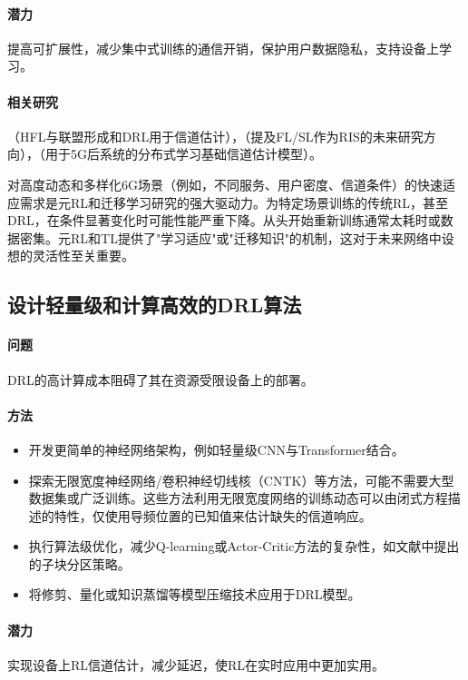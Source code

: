 \documentclass[journal]{IEEEtran}
\begin{document}
\paragraph{潜力} 
提高可扩展性，减少集中式训练的通信开销，保护用户数据隐私，支持设备上学习。

\paragraph{相关研究} 
\cite{ref55}（HFL与联盟形成和DRL用于信道估计），\cite{ref7}（提及FL/SL作为RIS的未来研究方向），\cite{ref4}（用于5G后系统的分布式学习基础信道估计模型）。

对高度动态和多样化6G场景（例如，不同服务、用户密度、信道条件）的快速适应需求是元RL和迁移学习研究的强大驱动力。为特定场景训练的传统RL，甚至DRL，在条件显著变化时可能性能严重下降。从头开始重新训练通常太耗时或数据密集\cite{ref49}。元RL\cite{ref48}和TL\cite{ref54}提供了"学习适应"或"迁移知识"的机制，这对于未来网络中设想的灵活性至关重要。

\subsection{设计轻量级和计算高效的DRL算法}

\paragraph{问题} 
DRL的高计算成本阻碍了其在资源受限设备上的部署\cite{ref11}。

\paragraph{方法}
\begin{itemize}
\item 开发更简单的神经网络架构，例如轻量级CNN与Transformer结合\cite{ref46}。
\item 探索无限宽度神经网络/卷积神经切线核（CNTK）等方法，可能不需要大型数据集或广泛训练\cite{ref46}。这些方法利用无限宽度网络的训练动态可以由闭式方程描述的特性，仅使用导频位置的已知值来估计缺失的信道响应。
\item 执行算法级优化，减少Q-learning或Actor-Critic方法的复杂性，如文献\cite{ref13}中提出的子块分区策略。
\item 将修剪、量化或知识蒸馏等模型压缩技术应用于DRL模型。
\end{itemize}

\paragraph{潜力} 
实现设备上RL信道估计，减少延迟，使RL在实时应用中更加实用。
\end{document}
